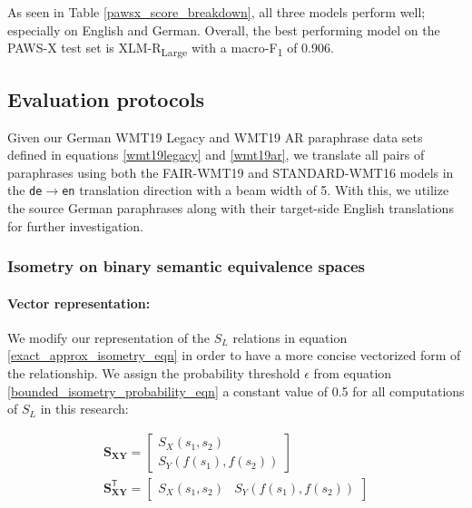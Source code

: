 \documentclass[11pt,a4paper]{article}
\begin{document}
As seen in Table \ref{pawsx_score_breakdown}, all three models perform well;
especially on English and German. Overall, the best performing model on the
PAWS-X test set is XLM-R\textsubscript{Large} with a macro-F\textsubscript{1} of
0.906.

\subsection{Evaluation protocols}

Given our German WMT19 Legacy and WMT19 AR paraphrase data sets defined in
equations \ref{wmt19legacy} and \ref{wmt19ar}, we translate all pairs of
paraphrases using both the FAIR-WMT19 and STANDARD-WMT16 models in the
\texttt{de$\rightarrow$en} translation direction with a beam width of 5. With
this, we utilize the source German paraphrases along with their target-side
English translations for further investigation.

\subsubsection{Isometry on binary semantic equivalence spaces}

\paragraph{Vector representation:} We modify our representation of the $S_L$
relations in equation \ref{exact_approx_isometry_eqn} in order to have a more
concise vectorized form of the relationship. We assign the probability threshold
$\epsilon$ from equation \ref{bounded_isometry_probability_eqn} a constant value
of 0.5 for all computations of $S_L$ in this research:

\vspace{-5pt}
\begin{gather}
  \mathbf{S_{XY}} = \begin{bmatrix} S_X(s_1, s_2) \\[5pt] S_Y(f(s_1), f(s_2)) \end{bmatrix} \\[10pt]
  \mathbf{S_{XY}^{\mathsf{T}}} = \begin{bmatrix} S_X(s_1, s_2) & S_Y(f(s_1),
    f(s_2)) \end{bmatrix}
\end{gather}
\end{document}

